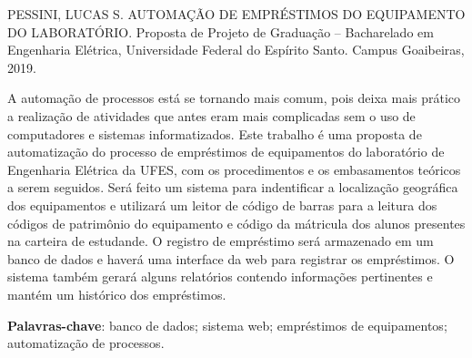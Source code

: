 \documentclass[
	12pt,				%
	openright,			%
	oneside,			%
	a4paper,			%
	chapter=TITLE,		%
	section=TITLE,		%
	english,			%
	french,				%
	spanish,			%
	brazil				%
	]{abntex2}
\begin{document}



\setlength{\absparsep}{18pt} %
\begin{resumo}
PESSINI, LUCAS S. AUTOMAÇÃO DE EMPRÉSTIMOS DO EQUIPAMENTO DO LABORATÓRIO. Proposta de Projeto de Graduação – Bacharelado em Engenharia Elétrica, Universidade Federal do Espírito Santo. Campus
Goaibeiras, 2019.

 A automação de processos está se tornando mais comum, pois deixa mais prático a realização de atividades que antes eram mais complicadas sem o uso de computadores e sistemas informatizados. Este trabalho é uma proposta de automatização do processo de empréstimos de equipamentos do laboratório de Engenharia Elétrica da UFES, com os procedimentos e os embasamentos teóricos a serem seguidos. Será feito um sistema para indentificar a localização geográfica dos equipamentos e utilizará um leitor de código de barras para a leitura dos códigos de patrimônio do equipamento e código da mátricula dos alunos presentes na carteira de estudande. O registro de empréstimo será armazenado em um banco de dados e haverá uma interface da web para registrar os empréstimos. O sistema também gerará alguns relatórios contendo informações pertinentes e mantém um histórico dos empréstimos.

\textbf{Palavras-chave}: banco de dados; sistema web; empréstimos de equipamentos; automatização de processos.
\end{resumo}

 
\end{document}
